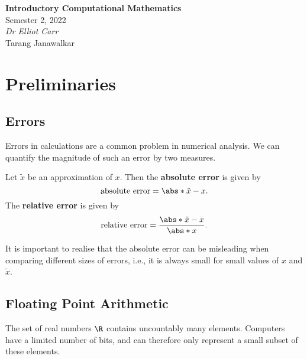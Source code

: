 \documentclass{article}
\date{}
\newcommand{\unitName}{Introductory Computational Mathematics}
\newcommand{\unitTime}{Semester 2, 2022}
\newcommand{\unitCoordinator}{Dr Elliot Carr}
\newcommand{\documentAuthors}{Tarang Janawalkar}
\begin{document}
%
\begin{titlepage}
    \vspace*{\fill}
    \begin{center}
        \LARGE{\textbf{\unitName}} \\[0.1in]
        \normalsize{\unitTime} \\[0.2in]
        \normalsize\textit{\unitCoordinator} \\[0.2in]
        \documentAuthors
    \end{center}
    \vspace*{\fill}
    \doclicenseThis
    \thispagestyle{empty}
\end{titlepage}
\newpage
%
\tableofcontents
\newpage
%
\section{Preliminaries}
\subsection{Errors}
Errors in calculations are a common problem in numerical analysis.
We can quantify the magnitude of such an error by two measures.
\begin{definition}
    Let \(\tilde{x}\) be an approximation of \(x\). Then the \textbf{absolute
        error} is given by
    \begin{equation*}
        \text{absolute error} = \abs*{\tilde{x}-x}.
    \end{equation*}
    The \textbf{relative error} is given by
    \begin{equation*}
        \text{relative error} = \frac{\abs*{\tilde{x}-x}}{\abs*{x}}.
    \end{equation*}
\end{definition}
It is important to realise that the absolute error can be
misleading when comparing different sizes of errors,
i.e., it is always small for small values of \(x\) and \(\tilde{x}\).
\subsection{Floating Point Arithmetic}
The set of real numbers \(\R\) contains uncountably many elements.
Computers have a limited number of bits, and can
therefore only represent a small subset of these elements.
\end{document}
